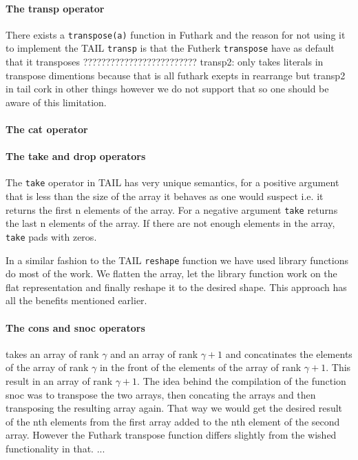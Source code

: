 \documentclass[11pt]{article}
\begin{document}
\paragraph{The transp operator} 
There exists a {\tt transpose(a)} function in Futhark and the reason for not using it to implement the TAIL {\tt transp} is that the Futherk {\tt transpose} have as default that it transposes ?????????????????????????
transp2: only takes literals in transpose dimentions because that is all futhark exepts in rearrange but transp2 in tail cork in other things however we do not support that so one should be aware of this limitation.

\paragraph{The cat operator} 

\paragraph{The take and drop operators} 
The {\tt take} operator in TAIL has very unique semantics, for a positive argument that is less than the size of the array it behaves as one would suspect i.e. it returns the first n elements of the array.
For a negative argument {\tt take} returns the last n elements of the array.
If there are not enough elements in the array, {\tt take} pads with zeros.

In a similar fashion to the TAIL {\tt reshape} function we have used library functions do most of the work.
We flatten the array, let the library function work on the flat representation and finally reshape it to the desired shape.
This approach has all the benefits mentioned earlier.

\paragraph{The cons and snoc operators} takes an array of rank $\gamma$ and an array of rank $\gamma+1$ and concatinates the elements of the 
array of rank $\gamma$ in the front of the elements of the array of rank $\gamma +1$. This result in an array of rank $\gamma+1$. 
The idea behind the compilation of the function snoc was to transpose the two arrays, then concating the arrays and then transposing the resulting array again. That way we would get the desired result of the nth elements from the first array added to the nth element of the second array. However the Futhark transpose function differs slightly from the wished functionality in that. ...\\
\end{document}
